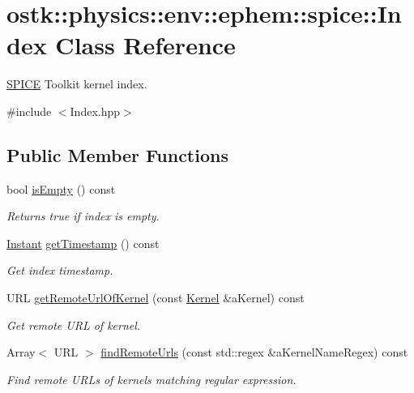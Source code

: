 \hypertarget{classostk_1_1physics_1_1env_1_1ephem_1_1spice_1_1_index}{}\section{ostk\+:\+:physics\+:\+:env\+:\+:ephem\+:\+:spice\+:\+:Index Class Reference}
\label{classostk_1_1physics_1_1env_1_1ephem_1_1spice_1_1_index}


\hyperlink{classostk_1_1physics_1_1env_1_1ephem_1_1_s_p_i_c_e}{S\+P\+I\+CE} Toolkit kernel index.  




{\ttfamily \#include $<$Index.\+hpp$>$}

\subsection*{Public Member Functions}
\begin{DoxyCompactItemize}
\item 
bool \hyperlink{classostk_1_1physics_1_1env_1_1ephem_1_1spice_1_1_index_a4c94c88d8e3fe896eaaa2baa1c0b3bb8}{is\+Empty} () const
\begin{DoxyCompactList}\small\item\em Returns true if index is empty. \end{DoxyCompactList}\item 
\hyperlink{classostk_1_1physics_1_1time_1_1_instant}{Instant} \hyperlink{classostk_1_1physics_1_1env_1_1ephem_1_1spice_1_1_index_ac9084f3d77dbe04d460ee335907fab83}{get\+Timestamp} () const
\begin{DoxyCompactList}\small\item\em Get index timestamp. \end{DoxyCompactList}\item 
U\+RL \hyperlink{classostk_1_1physics_1_1env_1_1ephem_1_1spice_1_1_index_a486ec6dad159dfdee2436be60ba5eb20}{get\+Remote\+Url\+Of\+Kernel} (const \hyperlink{classostk_1_1physics_1_1env_1_1ephem_1_1spice_1_1_kernel}{Kernel} \&a\+Kernel) const
\begin{DoxyCompactList}\small\item\em Get remote U\+RL of kernel. \end{DoxyCompactList}\item 
Array$<$ U\+RL $>$ \hyperlink{classostk_1_1physics_1_1env_1_1ephem_1_1spice_1_1_index_aa2bc4acdf1f1d209cb0fbe0f9a49a3f4}{find\+Remote\+Urls} (const std\+::regex \&a\+Kernel\+Name\+Regex) const
\begin{DoxyCompactList}\small\item\em Find remote U\+R\+Ls of kernels matching regular expression. \end{DoxyCompactList}\end{DoxyCompactItemize}

